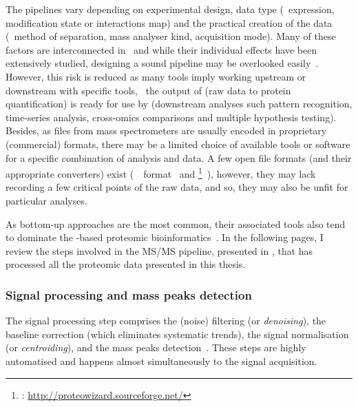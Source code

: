 The pipelines vary depending on experimental design, data type
(\ie\ expression, modification state or interactions map)
and the practical creation of the data (\eg\ method of separation,
mass analyser kind, acquisition mode).
Many of these factors are interconnected in \ms\
and while their individual effects have been extensively studied,
designing a sound pipeline may be overlooked easily~.
However,
this risk is reduced as
many tools imply working upstream or downstream with specific tools,
\eg\ the output of \soft{MaxQuant} (raw data to protein quantification) is
ready for use by 
(downstream analyses such pattern recognition,
time-series analysis, cross-omics comparisons and multiple hypothesis testing).
Besides, as files from mass spectrometers are usually encoded
in proprietary (commercial) formats,
there may be a limited choice of available tools or software
for a specific combination of analysis and data.
A few open file formats (and their appropriate converters) exist
(\eg\ \mzml\ format~\mycite{mzML}
and \href{http://proteowizard.sourceforge.net/}{}\footnote{%
\soft{ProteoWizard}: \href{http://proteowizard.sourceforge.net/}%
{http://proteowizard.sourceforge.net/}}~\mycite{proteowizard2012}),
however, they may lack recording a few critical points of the raw data,
and so, they may also be unfit for particular analyses.

As bottom-up approaches are the most common,
their associated tools also tend to dominate
the \ms{}-based proteomic bioinformatics~.
In the following pages,
I review the steps involved in the \gls{MS/MS} pipeline,
presented in ,
that has processed all the proteomic data presented in this thesis.

\subsubsection{Signal processing and mass peaks detection}

The signal processing step comprises
the (noise) filtering (or \emph{denoising}),
the baseline correction (which eliminates systematic trends),
the signal normalisation (or \emph{centroiding}),
and the mass peaks detection~.
These steps are highly automatised and
happens almost simultaneously to the signal acquisition.

